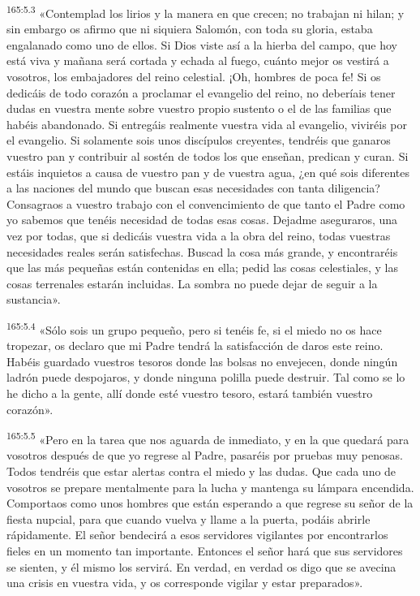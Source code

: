 \par 
\textsuperscript{165:5.3} «Contemplad los lirios y la manera en que crecen; no trabajan ni hilan; y sin embargo os afirmo que ni siquiera Salomón, con toda su gloria, estaba engalanado como uno de ellos. Si Dios viste así a la hierba del campo, que hoy está viva y mañana será cortada y echada al fuego, cuánto mejor os vestirá a vosotros, los embajadores del reino celestial. ¡Oh, hombres de poca fe! Si os dedicáis de todo corazón a proclamar el evangelio del reino, no deberíais tener dudas en vuestra mente sobre vuestro propio sustento o el de las familias que habéis abandonado. Si entregáis realmente vuestra vida al evangelio, viviréis por el evangelio. Si solamente sois unos discípulos creyentes, tendréis que ganaros vuestro pan y contribuir al sostén de todos los que enseñan, predican y curan. Si estáis inquietos a causa de vuestro pan y de vuestra agua, ¿en qué sois diferentes a las naciones del mundo que buscan esas necesidades con tanta diligencia? Consagraos a vuestro trabajo con el convencimiento de que tanto el Padre como yo sabemos que tenéis necesidad de todas esas cosas. Dejadme aseguraros, una vez por todas, que si dedicáis vuestra vida a la obra del reino, todas vuestras necesidades reales serán satisfechas. Buscad la cosa más grande, y encontraréis que las más pequeñas están contenidas en ella; pedid las cosas celestiales, y las cosas terrenales estarán incluidas. La sombra no puede dejar de seguir a la sustancia».

\par 
\textsuperscript{165:5.4} «Sólo sois un grupo pequeño, pero si tenéis fe, si el miedo no os hace tropezar, os declaro que mi Padre tendrá la satisfacción de daros este reino. Habéis guardado vuestros tesoros donde las bolsas no envejecen, donde ningún ladrón puede despojaros, y donde ninguna polilla puede destruir. Tal como se lo he dicho a la gente, allí donde esté vuestro tesoro, estará también vuestro corazón».

\par 
\textsuperscript{165:5.5} «Pero en la tarea que nos aguarda de inmediato, y en la que quedará para vosotros después de que yo regrese al Padre, pasaréis por pruebas muy penosas. Todos tendréis que estar alertas contra el miedo y las dudas. Que cada uno de vosotros se prepare mentalmente para la lucha y mantenga su lámpara encendida. Comportaos como unos hombres que están esperando a que regrese su señor de la fiesta nupcial, para que cuando vuelva y llame a la puerta, podáis abrirle rápidamente. El señor bendecirá a esos servidores vigilantes por encontrarlos fieles en un momento tan importante. Entonces el señor hará que sus servidores se sienten, y él mismo los servirá. En verdad, en verdad os digo que se avecina una crisis en vuestra vida, y os corresponde vigilar y estar preparados».


